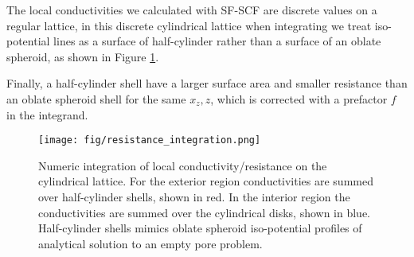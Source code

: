 \documentclass[10pt, a4paper]{article}
\newcommand\todo[1]{\textcolor{red}{#1}}
\begin{document}
\begin{multicols}{2}

The local conductivities we calculated with SF-SCF are discrete values on a regular lattice, in this discrete cylindrical lattice when integrating we treat iso-potential lines as a surface of half-cylinder rather than a surface of an oblate spheroid, as shown in Figure \ref{fig:integration_scheme}.

Finally, a half-cylinder shell have a larger surface area and smaller resistance than an oblate spheroid shell for the same $x_{z}, z$, which is corrected with a prefactor $f$ in the integrand.

\begin{figure}[H]
    \centering
    \texttt{[image: fig/resistance\_integration.png]}
    \caption{
        Numeric integration of local conductivity/resistance on the cylindrical lattice. 
        For the exterior region conductivities are summed over half-cylinder shells, shown in red.
        In the interior region the conductivities are summed over the cylindrical disks, shown in blue.
        Half-cylinder shells mimics oblate spheroid iso-potential profiles of analytical solution to an empty pore problem.
        }
    \label{fig:integration_scheme}
\end{figure}


\end{multicols}
\end{document}
